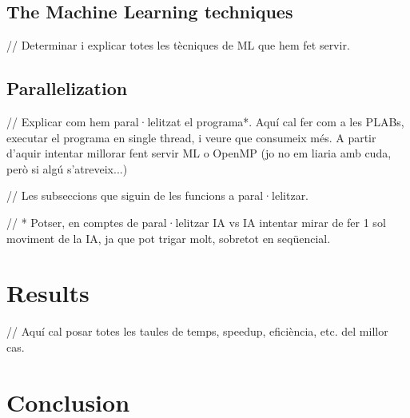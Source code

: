 \documentclass[twocolumn]{article}
\begin{document}
\subsection{The Machine Learning techniques}

// Determinar i explicar totes les tècniques de ML que hem fet servir. 

\subsection{Parallelization}

// Explicar com hem paral·lelitzat el programa*. Aquí cal fer com a les PLABs, executar el programa en single thread, i veure que consumeix més. A partir d'aquir intentar millorar fent servir ML o OpenMP (jo no em liaria amb cuda, però si algú s'atreveix...)

// Les subseccions que siguin de les funcions a paral·lelitzar.

// * Potser, en comptes de paral·lelitzar IA vs IA intentar mirar de fer 1 sol moviment de la IA, ja que pot trigar molt, sobretot en seqüencial. 

\section{Results}

// Aquí cal posar totes les taules de temps, speedup, eficiència, etc. del millor cas.

\section{Conclusion}




\end{document}
